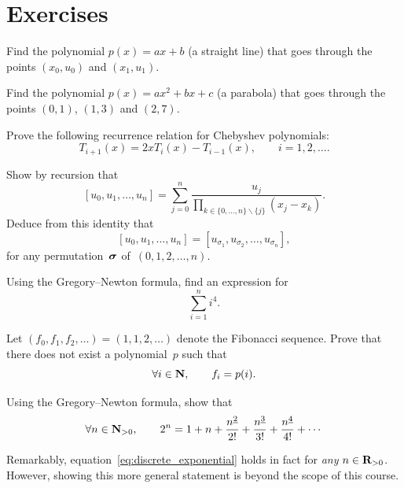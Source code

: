 \section{Exercises}
\begin{exercise}
    Find the polynomial $p(x) = ax + b$ (a straight line) that goes through the points $(x_0, u_0)$ and $(x_1, u_1)$.
\end{exercise}

\begin{exercise}
    Find the polynomial $p(x) = ax^2 + b x + c$ (a parabola) that goes through the points $(0, 1)$, $(1, 3)$ and $(2, 7)$.
\end{exercise}

\begin{exercise}
    Prove the following recurrence relation for Chebyshev polynomials:
    \[
        T_{i+1}(x) = 2 x T_i(x) - T_{i-1}(x), \qquad i = 1, 2, \dotsc.
    \]
\end{exercise}

\begin{exercise}
    \label{exercise:divided_differences}
    Show by recursion that
    \[
        [u_{0}, u_{1}, \dotsc, u_{n}] = \sum_{j=0}^{n} \frac{u_{j}}{\prod_{ k \in \{0, \dotsc, n\} \backslash \{ j\}} (x_{j} - x_{k})}.
    \]
    Deduce from this identity that
    \[
        [u_{0}, u_{1}, \dotsc, u_{n}] = [u_{\sigma_1}, u_{\sigma_2}, \dotsc, u_{\sigma_n}],
    \]
    for any permutation~$\mathbf{\boldsymbol{\sigma}}$ of~$(0, 1, 2, \dotsc, n)$.
\end{exercise}

\begin{exercise}
    Using the Gregory--Newton formula,
    find an expression for
    \[
        \sum_{i=1}^{n} i^4.
    \]
\end{exercise}

\begin{exercise}
    Let $(f_0, f_1, f_2, \dotsc) = (1, 1, 2, \dotsc)$ denote the Fibonacci sequence.
    Prove that there does not exist a polynomial~$p$ such that
    \[
        \forall i \in \mathbf N, \qquad
        f_i = p(i).
    \]
\end{exercise}

\begin{exercise}
    Using the Gregory--Newton formula,
    show that
    \begin{equation}
        \label{eq:discrete_exponential}
        \forall n \in \mathbf N_{>0},
        \qquad 2^n = 1 + n + \frac{n^{\underline{2}}}{2!} + \frac{n^{\underline 3}}{3!} + \frac{n^{\underline 4}}{4!} + \dotsb
    \end{equation}
    \begin{remark}
        Remarkably, equation~\eqref{eq:discrete_exponential} holds in fact for \emph{any} $n \in \mathbf R_{> 0}$.
        However, showing this more general statement is beyond the scope of this course.
    \end{remark}
\end{exercise}


